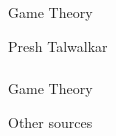 \begin{frame}[fragile]\frametitle{}
\begin{center}
{\Large Game Theory}

{\small {Presh Talwalkar}}


\end{center}
\end{frame}




\begin{frame}[fragile]\frametitle{}
\begin{center}
{\Large Game Theory}

{\small Other sources}


\end{center}
\end{frame}



